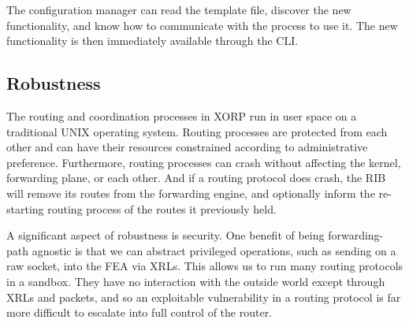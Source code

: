 The configuration manager can read the template file, discover the new
functionality, and know how to communicate with the process to use it.
The new functionality is then immediately available through the CLI.

\subsection{Robustness}

The routing and coordination processes in XORP run in user space on a
traditional UNIX operating system.  Routing processes are protected
from each other and can have their resources constrained according to
administrative preference.  Furthermore, routing processes can crash
without affecting the kernel, forwarding plane, or each other.  And if
a routing protocol does crash, the RIB will remove its routes
from the forwarding engine, and optionally inform the re-starting
routing process of the routes it previously held.


A significant aspect of robustness is security.  One benefit of
being forwarding-path agnostic is that we can abstract
privileged operations, such as sending on a raw socket, into
the FEA via XRLs.  This allows us to run many routing protocols
in a sandbox. They have no interaction with the outside world except
through XRLs and packets, and so an exploitable vulnerability in a routing
protocol is far more difficult to escalate into full control of the
router.


